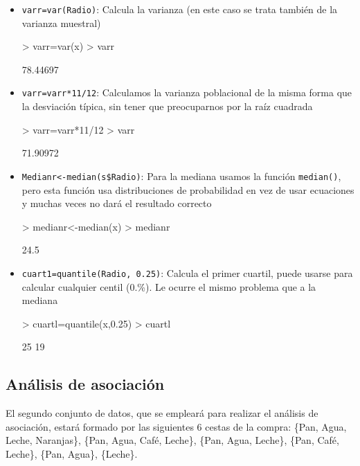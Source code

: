 \documentclass[a4paper, 12pt]{article}
\begin{document}
\begin{itemize}
		\item \texttt{varr=var(Radio)}: Calcula la varianza (en este caso se trata también de la varianza muestral)
\begin{Schunk}
\begin{Sinput}
> varr=var(x)
> varr
\end{Sinput}
\begin{Soutput}
[1] 78.44697
\end{Soutput}
\end{Schunk}
		\item \texttt{varr=varr*11/12}: Calculamos la varianza poblacional de la misma forma que la desviación típica, sin tener que preocuparnos por la raíz cuadrada
\begin{Schunk}
\begin{Sinput}
> varr=varr*11/12
> varr
\end{Sinput}
\begin{Soutput}
[1] 71.90972
\end{Soutput}
\end{Schunk}
		\item \texttt{Medianr<-median(s\$Radio)}: Para la mediana usamos la función \texttt{median()}, pero esta función usa distribuciones de probabilidad en vez de usar ecuaciones y muchas veces no dará el resultado correcto
\begin{Schunk}
\begin{Sinput}
> medianr<-median(x)
> medianr
\end{Sinput}
\begin{Soutput}
[1] 24.5
\end{Soutput}
\end{Schunk}
		\item \texttt{cuart1=quantile(Radio, 0.25)}: Calcula el primer cuartil, puede usarse para calcular cualquier centil (0.\%). Le ocurre el mismo problema que a la mediana
\begin{Schunk}
\begin{Sinput}
> cuartl=quantile(x,0.25)
> cuartl
\end{Sinput}
\begin{Soutput}
25%
 19 
\end{Soutput}
\end{Schunk}
	\end{itemize}
	
	
	\subsection{Análisis de asociación}
	El segundo conjunto de datos, que se empleará para realizar el análisis de asociación, estará formado por las siguientes 6 cestas de la compra: \{Pan, Agua, Leche, Naranjas\}, \{Pan, Agua, Café, Leche\}, \{Pan, Agua, Leche\}, \{Pan, Café, Leche\}, \{Pan, Agua\}, \{Leche\}.
	
\end{document}

